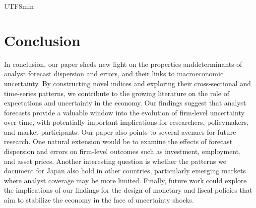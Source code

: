 \documentclass[12pt, a4paper]{article}
\begin{document}
\begin{CJK}{UTF8}{min}
\section{Conclusion}
In conclusion, our paper sheds new light on the properties anddeterminants of analyst forecast dispersion and errors, and their links to macroeconomic uncertainty. By constructing novel indices and exploring their cross-sectional and time-series patterns, we contribute to the growing literature on the role of expectations and uncertainty in the economy. Our findings suggest that analyst forecasts provide a valuable window into the evolution of firm-level uncertainty over time, with potentially important implications for researchers, policymakers, and market participants.
Our paper also points to several avenues for future research. One natural extension would be to examine the effects of forecast dispersion and errors on firm-level outcomes such as investment, employment, and asset prices. Another interesting question is whether the patterns we document for Japan also hold in other countries, particularly emerging markets where analyst coverage may be more limited. Finally, future work could explore the implications of our findings for the design of monetary and fiscal policies that aim to stabilize the economy in the face of uncertainty shocks.







\end{CJK}
\end{document}
